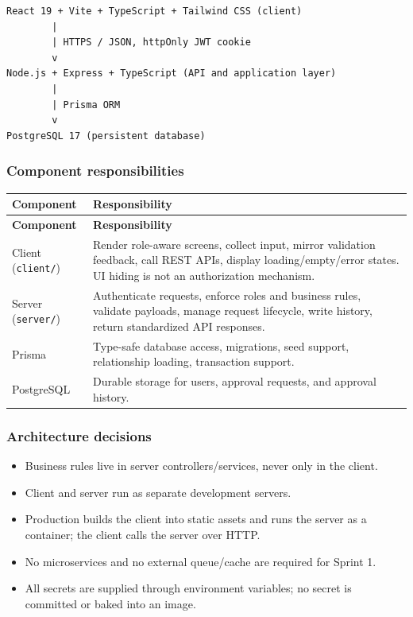 \documentclass[11pt,a4paper]{article}
\begin{document}
\begin{lstlisting}[basicstyle=\ttfamily\scriptsize]
React 19 + Vite + TypeScript + Tailwind CSS (client)
        |
        | HTTPS / JSON, httpOnly JWT cookie
        v
Node.js + Express + TypeScript (API and application layer)
        |
        | Prisma ORM
        v
PostgreSQL 17 (persistent database)
\end{lstlisting}

\subsubsection{Component responsibilities}

\vspace{0.3em}
\begin{longtable}{|>{\RaggedRight}p{4.5cm}|>{\RaggedRight}p{11.3cm}|}
\hline
\rowcolor{zenPale}\textbf{Component} & \textbf{Responsibility} \\ \hline
\endfirsthead
\hline
\rowcolor{zenPale}\textbf{Component} & \textbf{Responsibility} \\ \hline
\endhead
\hline
\endfoot
Client (\texttt{client/\allowbreak }) & Render role-aware screens, collect input, mirror validation feedback, call REST APIs, display loading/empty/error states. UI hiding is not an authorization mechanism. \\ \hline
Server (\texttt{server/\allowbreak }) & Authenticate requests, enforce roles and business rules, validate payloads, manage request lifecycle, write history, return standardized API responses. \\ \hline
Prisma & Type-safe database access, migrations, seed support, relationship loading, transaction support. \\ \hline
PostgreSQL & Durable storage for users, approval requests, and approval history. \\ \hline
\end{longtable}
\vspace{0.3em}

\subsubsection{Architecture decisions}

\begin{itemize}[leftmargin=*,itemsep=2pt,topsep=2pt]
  \item Business rules live in server controllers/services, never only in the client.
  \item Client and server run as separate development servers.
  \item Production builds the client into static assets and runs the server as a container; the client calls the server over HTTP.
  \item No microservices and no external queue/cache are required for Sprint 1.
  \item All secrets are supplied through environment variables; no secret is committed or baked into an image.
\end{itemize}
\end{document}
